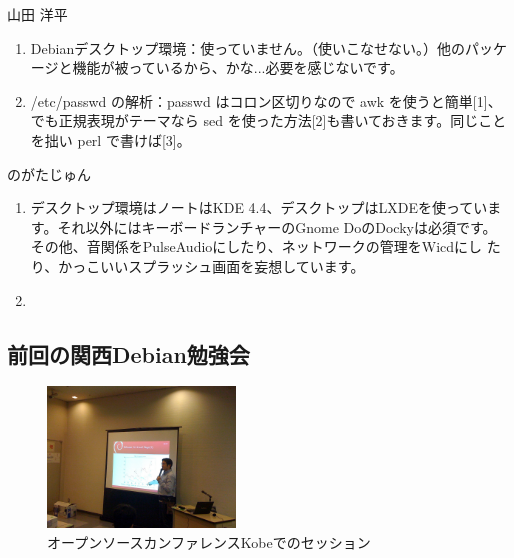 \documentclass[mingoth,a4paper]{jsarticle}
\begin{document}
\begin{prework}{ 山田 洋平 }
\begin{enumerate}
 \item Debianデスクトップ環境：使っていません。（使いこなせない。）他のパッケージと機能が被っているから、かな...必要を感じないです。
 \item /etc/passwd の解析：passwd はコロン区切りなので awk を使うと簡単[1]、でも正規表現がテーマなら sed を使った方法[2]も書いておきます。同じことを拙い perl で書けば[3]。
\end{enumerate}
\end{prework}

\begin{prework}{ のがたじゅん }
 \begin{enumerate}
       \item デスクトップ環境はノートはKDE 4.4、デスクトップはLXDEを使っていま
     す。それ以外にはキーボードランチャーのGnome DoのDockyは必須です。
     その他、音関係をPulseAudioにしたり、ネットワークの管理をWicdにし
     たり、かっこいいスプラッシュ画面を妄想しています。
       \item 　
 \end{enumerate}
\end{prework}


\subsection{前回の関西Debian勉強会}

\begin{figure}
 \begin{center}
 \includegraphics[width=5cm]{image201004/osckobe.jpg}
 \caption{オープンソースカンファレンスKobeでのセッション}
 \end{center}
\end{figure}
\end{document}
